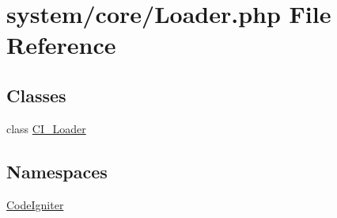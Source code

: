 \hypertarget{_loader_8php}{}\section{system/core/\+Loader.php File Reference}
\label{_loader_8php}
\subsection*{Classes}
\begin{DoxyCompactItemize}
\item 
class \mbox{\hyperlink{class_c_i___loader}{C\+I\+\_\+\+Loader}}
\end{DoxyCompactItemize}
\subsection*{Namespaces}
\begin{DoxyCompactItemize}
\item 
 \mbox{\hyperlink{namespace_code_igniter}{Code\+Igniter}}
\end{DoxyCompactItemize}
